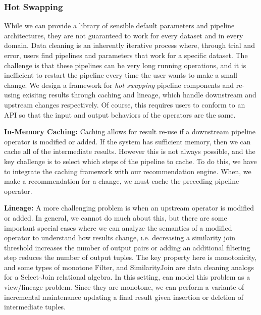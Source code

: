 \subsubsection{Hot Swapping}
While we can provide a library of sensible default parameters and pipeline architectures, they are not guaranteed to work for every dataset and in every domain. 
Data cleaning is an inherently iterative process where, through trial and error, users find pipelines and parameters that work for a specific dataset.
The challenge is that these pipelines can be very long running operations, and it is inefficient to restart the pipeline every time the user wants to make a small change.
We design a framework for \emph{hot swapping} pipeline components and re-using exisitng results through caching and lineage, which handle downstream and upstream changes respectively.
Of course, this requires users to conform to an API so that the input and output behaviors of the operators are the same.

\vspace{.5em}

{\noindent \bf In-Memory Caching: } Caching allows for result re-use if a downstream pipeline operator is modified or added.
If the system has sufficient memory, then we can cache all of the intermediate results. 
However this is not always possible, and the key challenge is to select which steps of the pipeline to cache.
To do this, we have to integrate the caching framework with our recommendation engine.
When, we make a recommendation for a change, we must cache the preceding pipeline operator. 

\vspace{.5em}

{\noindent \bf Lineage: } A more challenging problem is when an upstream operator is modified or added.
In general, we cannot do much about this, but there are some important special cases where we can analyze the
semantics of a modified operator to understand how results change, \i.e. decreasing a similarity join threshold increases the number of output pairs or adding an additional filtering step reduces the number of output tuples. 
The key property here is monotonicity, and some types of monotone \textsf{Filter}, and \textsf{SimilarityJoin} are data cleaning analogs for a Select-Join relational algebra.
In this setting, can model this problem as a view/lineage problem.
Since they are monotone, we can perform a variante of incremental maintenance updating a final result given insertion or deletion of intermediate tuples.

